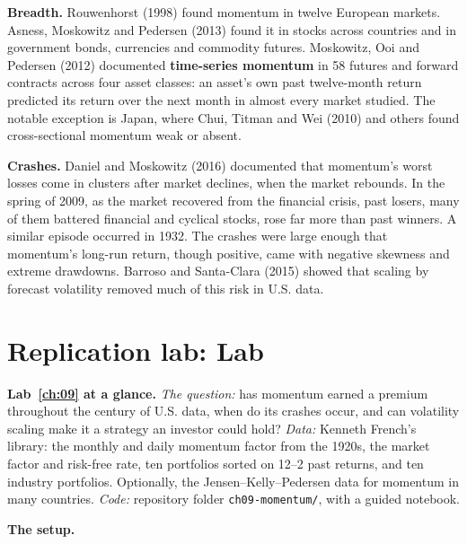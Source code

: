 \textbf{Breadth.} Rouwenhorst (1998) found momentum in twelve European markets. Asness, Moskowitz and Pedersen (2013) found it in stocks across countries and in government bonds, currencies and commodity futures. Moskowitz, Ooi and Pedersen (2012) documented \textbf{time-series momentum} in 58 futures and forward contracts across four asset classes: an asset's own past twelve-month return predicted its return over the next month in almost every market studied. The notable exception is Japan, where Chui, Titman and Wei (2010) and others found cross-sectional momentum weak or absent.

\textbf{Crashes.} Daniel and Moskowitz (2016) documented that momentum's worst losses come in clusters after market declines, when the market rebounds. In the spring of 2009, as the market recovered from the financial crisis, past losers, many of them battered financial and cyclical stocks, rose far more than past winners. A similar episode occurred in 1932. The crashes were large enough that momentum's long-run return, though positive, came with negative skewness and extreme drawdowns. Barroso and Santa-Clara (2015) showed that scaling by forecast volatility removed much of this risk in U.S. data.

\section{Replication lab: Lab~\thechapter}
\label{sec:09-lab}

\begin{callout}
\textbf{Lab~\ref{ch:09} at a glance.} \emph{The question:} has momentum earned a premium throughout the century of U.S. data, when do its crashes occur, and can volatility scaling make it a strategy an investor could hold? \emph{Data:} Kenneth French's library: the monthly and daily momentum factor from the 1920s, the market factor and risk-free rate, ten portfolios sorted on 12--2 past returns, and ten industry portfolios. Optionally, the Jensen--Kelly--Pedersen data for momentum in many countries. \emph{Code:} repository folder \texttt{ch09-momentum/}, with a guided notebook.
\end{callout}

\textbf{The setup.}

